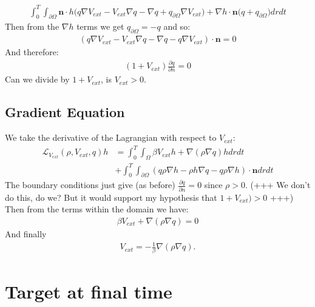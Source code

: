 \documentclass[11pt, a4paper]{article}
\theoremstyle{definition}
\newcommand{\n}{\mathbf{n}}
\begin{document}
	\begin{align*}
		\int_0^T \int_{\partial \Omega} \n \cdot h \bigg(q  \nabla V_{ext} -  V_{ext} \nabla q -\nabla q + q_{\partial \Omega} \nabla V_{ext} \bigg) +
		\nabla h \cdot \n \bigg(q  + q_{\partial \Omega}  \bigg)dr dt
	\end{align*}
Then from the $\nabla h$ terms we get $q_{\partial \Omega} = - q$ and so:
\begin{align*}
	(q  \nabla V_{ext} -  V_{ext} \nabla q -\nabla q - q \nabla V_{ext}  ) \cdot \n = 0
\end{align*}
	And therefore:
	\begin{align*}
		(1 + V_{ext})\frac{\partial q}{\partial n} = 0
	\end{align*}
Can we divide by $1 + V_{ext}$, is $V_{ext} > 0$.
	\subsection{Gradient Equation}
	We take the derivative of the Lagrangian with respect to $V_{ext}$:
	\begin{align*}
		\mathcal{L}_{V_{ext}} (\rho, V_{ext},q)h &= \int_0^T \int_\Omega \beta V_{ext} h + \nabla(\rho \nabla q) h dr dt \\
		&+\int_0^T \int_{\partial \Omega} (q \rho \nabla h - \rho h \nabla q - q \rho \nabla h) \cdot \n dr dt
	\end{align*}
	The boundary conditions just give (as before) $\frac{\partial q}{\partial n} = 0$ since $\rho >0$. (+++ We don't do this, do we? But it would support my hypothesis that $1 + V_{ext}) >0$ +++)
	Then from the terms within the domain we have:
	\begin{align*}
		\beta V_{ext}  + \nabla(\rho \nabla q)  = 0
	\end{align*}
	And finally 
	\begin{align*}
		V_{ext} = - \frac{1}{\beta} \nabla(\rho \nabla q).
	\end{align*}
	
	
	\section{Target at final time}
	
\end{document}
